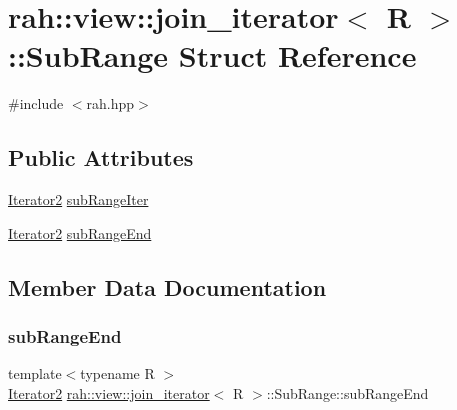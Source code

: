 \hypertarget{structrah_1_1view_1_1join__iterator_1_1_sub_range}{}\section{rah\+::view\+::join\+\_\+iterator$<$ R $>$\+::Sub\+Range Struct Reference}
\label{structrah_1_1view_1_1join__iterator_1_1_sub_range}


{\ttfamily \#include $<$rah.\+hpp$>$}

\subsection*{Public Attributes}
\begin{DoxyCompactItemize}
\item 
\mbox{\hyperlink{structrah_1_1view_1_1join__iterator_ae03a066174f3422c70d0e3c22e68d9f7}{Iterator2}} \mbox{\hyperlink{structrah_1_1view_1_1join__iterator_1_1_sub_range_a4073148b86fc958e754b23af1befce93}{sub\+Range\+Iter}}
\item 
\mbox{\hyperlink{structrah_1_1view_1_1join__iterator_ae03a066174f3422c70d0e3c22e68d9f7}{Iterator2}} \mbox{\hyperlink{structrah_1_1view_1_1join__iterator_1_1_sub_range_a59768b4f12beb31f228a01dad4618c8c}{sub\+Range\+End}}
\end{DoxyCompactItemize}


\subsection{Member Data Documentation}
\mbox{\label{structrah_1_1view_1_1join__iterator_1_1_sub_range_a59768b4f12beb31f228a01dad4618c8c}} 
\subsubsection{\texorpdfstring{subRangeEnd}{subRangeEnd}}
{\footnotesize\ttfamily template$<$typename R $>$ \\
\mbox{\hyperlink{structrah_1_1view_1_1join__iterator_ae03a066174f3422c70d0e3c22e68d9f7}{Iterator2}} \mbox{\hyperlink{structrah_1_1view_1_1join__iterator}{rah\+::view\+::join\+\_\+iterator}}$<$ R $>$\+::Sub\+Range\+::sub\+Range\+End}

